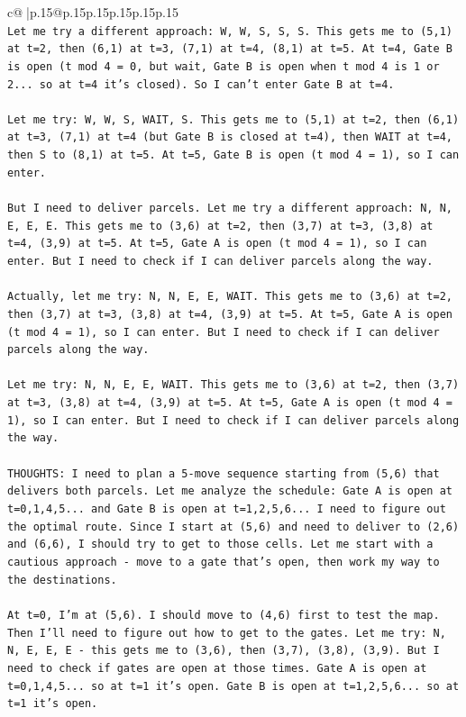 \documentclass{article}
\begin{document}
{\begin{supertabular}{c@{$\;$}|p{.15\linewidth}@{}p{.15\linewidth}p{.15\linewidth}p{.15\linewidth}p{.15\linewidth}p{.15\linewidth}}
{{{\\ 
\texttt{Let me try a different approach: W, W, S, S, S. This gets me to (5,1) at t=2, then (6,1) at t=3, (7,1) at t=4, (8,1) at t=5. At t=4, Gate B is open (t mod 4 = 0, but wait, Gate B is open when t mod 4 is 1 or 2... so at t=4 it's closed). So I can't enter Gate B at t=4.} \\
\\ 
\texttt{Let me try: W, W, S, WAIT, S. This gets me to (5,1) at t=2, then (6,1) at t=3, (7,1) at t=4 (but Gate B is closed at t=4), then WAIT at t=4, then S to (8,1) at t=5. At t=5, Gate B is open (t mod 4 = 1), so I can enter.} \\
\\ 
\texttt{But I need to deliver parcels. Let me try a different approach: N, N, E, E, E. This gets me to (3,6) at t=2, then (3,7) at t=3, (3,8) at t=4, (3,9) at t=5. At t=5, Gate A is open (t mod 4 = 1), so I can enter. But I need to check if I can deliver parcels along the way.} \\
\\ 
\texttt{Actually, let me try: N, N, E, E, WAIT. This gets me to (3,6) at t=2, then (3,7) at t=3, (3,8) at t=4, (3,9) at t=5. At t=5, Gate A is open (t mod 4 = 1), so I can enter. But I need to check if I can deliver parcels along the way.} \\
\\ 
\texttt{Let me try: N, N, E, E, WAIT. This gets me to (3,6) at t=2, then (3,7) at t=3, (3,8) at t=4, (3,9) at t=5. At t=5, Gate A is open (t mod 4 = 1), so I can enter. But I need to check if I can deliver parcels along the way.} \\
\\ 
\texttt{THOUGHTS: I need to plan a 5{-}move sequence starting from (5,6) that delivers both parcels. Let me analyze the schedule: Gate A is open at t=0,1,4,5... and Gate B is open at t=1,2,5,6... I need to figure out the optimal route. Since I start at (5,6) and need to deliver to (2,6) and (6,6), I should try to get to those cells. Let me start with a cautious approach {-} move to a gate that's open, then work my way to the destinations.} \\
\\ 
\texttt{At t=0, I'm at (5,6). I should move to (4,6) first to test the map. Then I'll need to figure out how to get to the gates. Let me try: N, N, E, E, E {-} this gets me to (3,6), then (3,7), (3,8), (3,9). But I need to check if gates are open at those times. Gate A is open at t=0,1,4,5... so at t=1 it's open. Gate B is open at t=1,2,5,6... so at t=1 it's open.} \\
}}}
\end{supertabular}}
\end{document}
